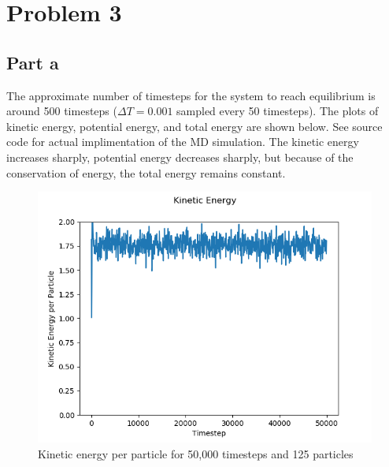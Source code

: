 \documentclass{article}
\begin{document}
\newpage

\section*{Problem 3}


\subsection*{Part a}

	The approximate number of timesteps for the system to reach equilibrium is around 500 timesteps ($\Delta T = 0.001$ sampled every 50 timesteps). The plots of kinetic energy, potential energy, and total energy are shown below. See source code for actual implimentation of the MD simulation. The kinetic energy increases sharply, potential energy decreases sharply, but because of the conservation of energy, the total energy remains constant.

	\begin{figure}[H]
				\centering
				\includegraphics[scale=0.5]{kin_energy}
				\caption{Kinetic energy per particle for 50,000 timesteps and 125 particles}
	\end{figure}
\end{document}
